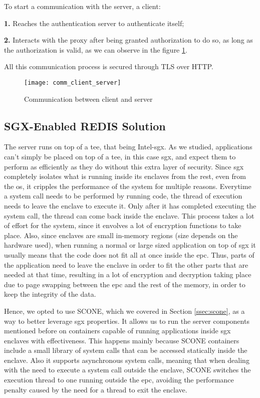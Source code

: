 To start a communication with the server, a client: 

\textbf{1.} Reaches the authentication server to authenticate itself;

\textbf{2.} Interacts with the proxy after being granted authorization to do so, as long as the authorization is valid, as we can observe in the figure \ref{fig:client_serverModel}. 

All this communication process is secured through TLS over HTTP.

\begin{figure}[htbp]
	\centering
	{\texttt{[image: comm\_client\_server]}}
	\caption{Communication between client and server}
	\label{fig:client_serverModel}
\end{figure}



\subsection{SGX-Enabled REDIS Solution} %
\label{ssec:sgx_redisSolution}

The server runs on top of a \gls{tee}, that being Intel-\gls{sgx}. As we studied, applications can't simply be placed on top of a \gls{tee}, in this case \gls{sgx}, and expect them to perform as efficiently as they do without this extra layer of security. 
Since \gls{sgx} completely isolates what is running inside its enclaves from the rest, even from the \gls{os}, it cripples the performance of the system for multiple reasons. Everytime a system call needs to be performed by running code, the thread of execution needs to leave the enclave to execute it. Only after it has completed executing the system call, the thread can come back inside the enclave. This process takes a lot of effort for the system, since it envolves a lot of encryption functions to take place. 
Also, since enclaves are small in-memory regions (size depends on the hardware used), when running a normal or large sized application on top of \gls{sgx} it usually means that the code does not fit all at once inside the \gls{epc}. 
Thus, parts of the application need to leave the enclave in order to fit the other parts that are needed at that time, resulting in a lot of encryption and decryption taking place due to page swapping between the \gls{epc} and the rest of the memory, in order to keep the integrity of the data.  

Hence, we opted to use SCONE, which we covered in Section  \ref{ssec:scone}, as a way to better leverage \gls{sgx} properties. It allows us to run the server components mentioned before on containers capable of running applications inside \gls{sgx} enclaves with effectiveness. This happens mainly because SCONE containers include a small library of system calls that can be accessed statically inside the enclave. Also it supports asynchronous system calls, meaning that when dealing with the need to execute a system call outside the enclave, SCONE switches the execution thread to one running outside the \gls{epc}, avoiding the performance penalty caused by the need for a thread to exit the enclave. 

